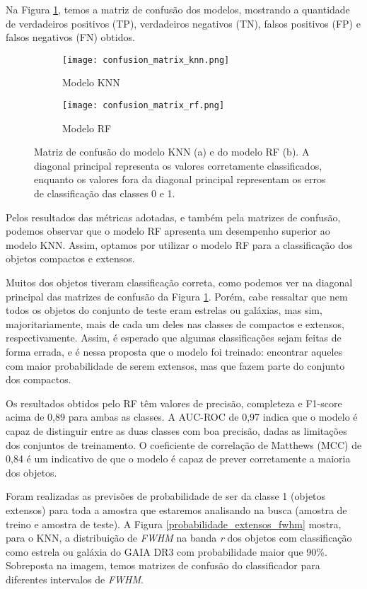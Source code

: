 Na Figura \ref{confusion_matrix}, temos a matriz de confusão dos modelos, mostrando a quantidade de verdadeiros positivos (TP), verdadeiros negativos (TN), falsos positivos (FP) e falsos negativos (FN) obtidos.

\begin{figure}[!ht]
    \centering
    \captionsetup{justification=centering}
    \begin{subfigure}[b]{0.45\textwidth}
        \texttt{[image: confusion\_matrix\_knn.png]}
        \caption{Modelo KNN}
    \end{subfigure}
    \begin{subfigure}[b]{0.45\textwidth}
        \texttt{[image: confusion\_matrix\_rf.png]}
        \caption{Modelo RF}
    \end{subfigure}
    \caption{Matriz de confusão do modelo KNN (a) e do modelo RF (b). A diagonal principal representa os valores corretamente classificados, enquanto os valores fora da diagonal principal representam os erros de classificação das classes 0 e 1.}
    \label{confusion_matrix}
\end{figure}

Pelos resultados das métricas adotadas, e também pela matrizes de confusão, podemos observar que o modelo RF apresenta um desempenho superior ao modelo KNN. Assim, optamos por utilizar o modelo RF para a classificação dos objetos compactos e extensos.

Muitos dos objetos tiveram classificação correta, como podemos ver na diagonal principal das matrizes de confusão da Figura \ref{confusion_matrix}. Porém, cabe ressaltar que nem todos os objetos do conjunto de teste eram estrelas ou galáxias, mas sim, majoritariamente, mais de cada um deles nas classes de compactos e extensos, respectivamente. Assim, é esperado que algumas classificações sejam feitas de forma errada, e é nessa proposta que o modelo foi treinado: encontrar aqueles com maior probabilidade de serem extensos, mas que fazem parte do conjunto dos compactos.

Os resultados obtidos pelo RF têm valores de precisão, completeza e F1-score acima de 0,89 para ambas as classes. A AUC-ROC de 0,97 indica que o modelo é capaz de distinguir entre as duas classes com boa precisão, dadas as limitações dos conjuntos de treinamento. O coeficiente de correlação de Matthews (MCC) de 0,84 é um indicativo de que o modelo é capaz de prever corretamente a maioria dos objetos.

Foram realizadas as previsões de probabilidade de ser da classe 1 (objetos extensos) para toda a amostra que estaremos analisando na busca (amostra de treino e amostra de teste). A Figura \ref{probabilidade_extensos_fwhm} mostra, para o KNN, a distribuição de \textit{FWHM} na banda \textit{r} dos objetos com classificação como estrela ou galáxia do GAIA DR3 com probabilidade maior que 90\%. Sobreposta na imagem, temos matrizes de confusão do classificador para diferentes intervalos de \textit{FWHM}.

